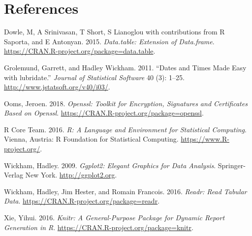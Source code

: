 \documentclass[]{article}
\begin{document}
\section*{References}\label{references}

\hypertarget{refs}{}
\hypertarget{ref-data.table}{}
Dowle, M, A Srinivasan, T Short, S Lianoglou with contributions from R
Saporta, and E Antonyan. 2015. \emph{Data.table: Extension of
Data.frame}. \url{https://CRAN.R-project.org/package=data.table}.

\hypertarget{ref-lubridate}{}
Grolemund, Garrett, and Hadley Wickham. 2011. ``Dates and Times Made
Easy with lubridate.'' \emph{Journal of Statistical Software} 40 (3):
1--25. \url{http://www.jstatsoft.org/v40/i03/}.

\hypertarget{ref-openssl}{}
Ooms, Jeroen. 2018. \emph{Openssl: Toolkit for Encryption, Signatures
and Certificates Based on Openssl}.
\url{https://CRAN.R-project.org/package=openssl}.

\hypertarget{ref-baseR}{}
R Core Team. 2016. \emph{R: A Language and Environment for Statistical
Computing}. Vienna, Austria: R Foundation for Statistical Computing.
\url{https://www.R-project.org/}.

\hypertarget{ref-ggplot2}{}
Wickham, Hadley. 2009. \emph{Ggplot2: Elegant Graphics for Data
Analysis}. Springer-Verlag New York. \url{http://ggplot2.org}.

\hypertarget{ref-readr}{}
Wickham, Hadley, Jim Hester, and Romain Francois. 2016. \emph{Readr:
Read Tabular Data}. \url{https://CRAN.R-project.org/package=readr}.

\hypertarget{ref-knitr}{}
Xie, Yihui. 2016. \emph{Knitr: A General-Purpose Package for Dynamic
Report Generation in R}. \url{https://CRAN.R-project.org/package=knitr}.
\end{document}
